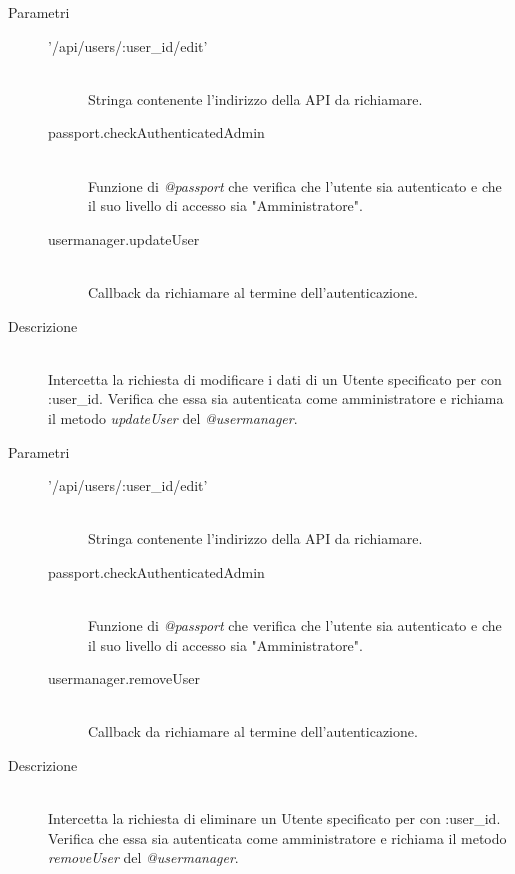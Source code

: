 \begin{description}
\begin{description}
\begin{mldescription}
     \hfill 
    \begin{description}
    \item[Parametri] \hfill
     \begin{description}
      \item['/api/users/:user\_id/edit'] \hfill \\
      Stringa contenente l'indirizzo della API da richiamare.
      \item[passport.checkAuthenticatedAdmin] \hfill \\
      Funzione di \textit{@passport} che verifica che l'utente sia autenticato e che il suo livello di accesso sia "Amministratore".
      \item[usermanager.updateUser] \hfill \\
      Callback da richiamare al termine dell'autenticazione.
     \end{description}
    \item[Descrizione] \hfill \\
    Intercetta la richiesta di modificare i dati di un Utente specificato per con :user\_id. Verifica che essa sia autenticata come amministratore e richiama il metodo \textit{updateUser} del \textit{@usermanager}.
    \end{description}
    
     \hfill 
    \begin{description}
    \item[Parametri] \hfill
     \begin{description}
      \item['/api/users/:user\_id/edit'] \hfill \\
      Stringa contenente l'indirizzo della API da richiamare.
      \item[passport.checkAuthenticatedAdmin] \hfill \\
      Funzione di \textit{@passport} che verifica che l'utente sia autenticato e che il suo livello di accesso sia "Amministratore".
      \item[usermanager.removeUser] \hfill \\
      Callback da richiamare al termine dell'autenticazione.
     \end{description}
    \item[Descrizione] \hfill \\
    Intercetta la richiesta di eliminare un Utente specificato per con :user\_id. Verifica che essa sia autenticata come amministratore e richiama il metodo \textit{removeUser} del \textit{@usermanager}. 
  \end{description}
  

\end{mldescription}
\end{description}
\end{description}
